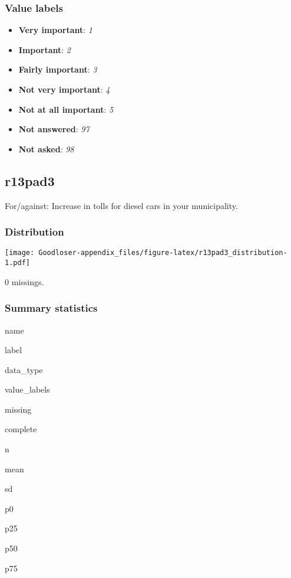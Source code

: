 \documentclass[]{book}
\providecommand{\tightlist}{%
  \setlength{\itemsep}{0pt}\setlength{\parskip}{0pt}}
\begin{document}
\subsubsection{Value labels}\label{r13pad2_labels}

\begin{itemize}
\tightlist
\item
  \textbf{Very important}: \emph{1}
\item
  \textbf{Important}: \emph{2}
\item
  \textbf{Fairly important}: \emph{3}
\item
  \textbf{Not very important}: \emph{4}
\item
  \textbf{Not at all important}: \emph{5}
\item
  \textbf{Not answered}: \emph{97}
\item
  \textbf{Not asked}: \emph{98}
\end{itemize}

\subsection{r13pad3}\label{r13pad3}

For/against: Increase in tolls for diesel cars in your municipality.

\subsubsection{Distribution}\label{r13pad3_distribution}

\texttt{[image: Goodloser-appendix\_files/figure-latex/r13pad3\_distribution-1.pdf]}

0 missings.

\subsubsection{Summary statistics}\label{r13pad3_summary}

name

label

data\_type

value\_labels

missing

complete

n

mean

sd

p0

p25

p50

p75
\end{document}
